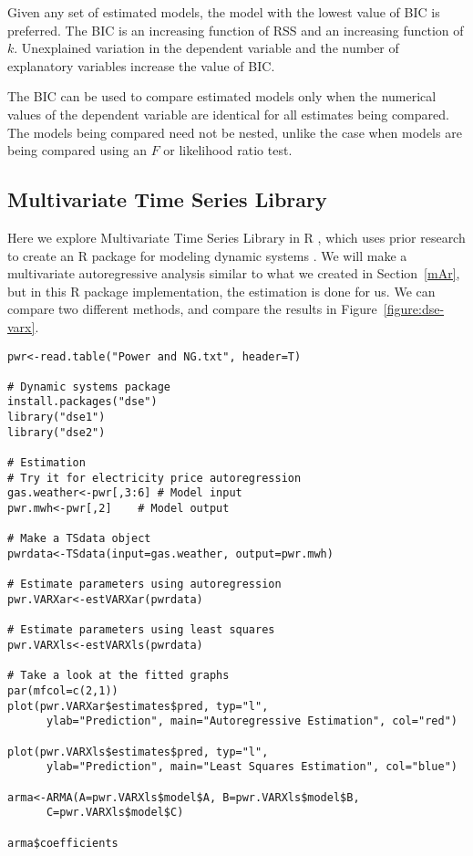 Given any set of estimated models, the model with the lowest value of BIC is preferred. The BIC is an increasing function of RSS and an increasing function of $k$. Unexplained variation in the dependent variable and the number of explanatory variables increase the value of BIC. 

The BIC can be used to compare estimated models only when the numerical values of the dependent variable are identical for all estimates being compared. The models being compared need not be nested, unlike the case when models are being compared using an $F$ or likelihood ratio test.

\subsection{Multivariate Time Series Library}
Here we explore Multivariate Time Series Library in R \cite{dse-R}, which uses prior research to create an R package for modeling dynamic systems \cite{gilbert1993ssarma,gilbert1995cveass,gilbert2000nocots}.
We will make a multivariate autoregressive analysis similar to what we created in Section~\ref{mAr}, but in this R package implementation, the estimation is done for us. We can compare two different methods, and compare the results in Figure~\ref{figure:dse-varx}.

\begin{verbatim}
pwr<-read.table("Power and NG.txt", header=T)

# Dynamic systems package
install.packages("dse")
library("dse1")
library("dse2")

# Estimation
# Try it for electricity price autoregression
gas.weather<-pwr[,3:6] # Model input
pwr.mwh<-pwr[,2]	# Model output

# Make a TSdata object
pwrdata<-TSdata(input=gas.weather, output=pwr.mwh)

# Estimate parameters using autoregression
pwr.VARXar<-estVARXar(pwrdata)

# Estimate parameters using least squares
pwr.VARXls<-estVARXls(pwrdata)

# Take a look at the fitted graphs
par(mfcol=c(2,1))
plot(pwr.VARXar$estimates$pred, typ="l",
      ylab="Prediction", main="Autoregressive Estimation", col="red")
      
plot(pwr.VARXls$estimates$pred, typ="l",
      ylab="Prediction", main="Least Squares Estimation", col="blue")

arma<-ARMA(A=pwr.VARXls$model$A, B=pwr.VARXls$model$B,
      C=pwr.VARXls$model$C)
      
arma$coefficients
\end{verbatim}

